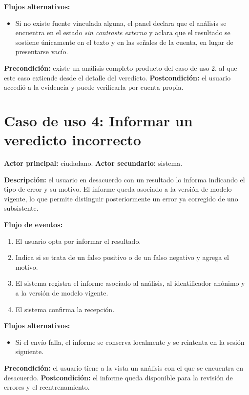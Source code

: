 \textbf{Flujos alternativos:}
\begin{itemize}
  \item Si no existe fuente vinculada alguna, el panel declara que el análisis se encuentra en el estado \emph{sin contraste externo} y aclara que el resultado se sostiene únicamente en el texto y en las señales de la cuenta, en lugar de presentarse vacío.
\end{itemize}

\textbf{Precondición:} existe un análisis completo producto del caso de uso 2, al que este caso extiende desde el detalle del veredicto.
\textbf{Postcondición:} el usuario accedió a la evidencia y puede verificarla por cuenta propia.

\section*{Caso de uso 4: Informar un veredicto incorrecto}

\textbf{Actor principal:} ciudadano. \textbf{Actor secundario:} sistema.

\textbf{Descripción:} el usuario en desacuerdo con un resultado lo informa indicando el tipo de error y su motivo. El informe queda asociado a la versión de modelo vigente, lo que permite distinguir posteriormente un error ya corregido de uno subsistente.

\textbf{Flujo de eventos:}
\begin{enumerate}
  \item El usuario opta por informar el resultado.
  \item Indica si se trata de un falso positivo o de un falso negativo y agrega el motivo.
  \item El sistema registra el informe asociado al análisis, al identificador anónimo y a la versión de modelo vigente.
  \item El sistema confirma la recepción.
\end{enumerate}

\textbf{Flujos alternativos:}
\begin{itemize}
  \item Si el envío falla, el informe se conserva localmente y se reintenta en la sesión siguiente.
\end{itemize}

\textbf{Precondición:} el usuario tiene a la vista un análisis con el que se encuentra en desacuerdo.
\textbf{Postcondición:} el informe queda disponible para la revisión de errores y el reentrenamiento.


